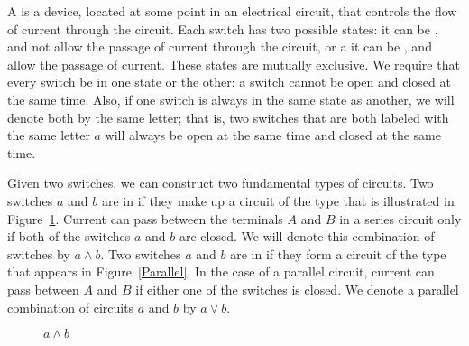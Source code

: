  
A  is a device, located at
some point in an electrical circuit, that controls the flow of current
through the circuit. Each switch has two possible states: it can
be , and not allow the passage of current
through the circuit,  or a it can be , and allow the passage of current. These
states are mutually exclusive. We require that every switch be in one 
state or the other: a switch cannot be open and closed at the same
time.  Also, if one switch is always in the same state as another, we
will denote both by the same letter; that is, two switches that are
both labeled with the same letter $a$ will always be open at the same
time and closed at the same time.  
 
 
Given two switches, we can construct two fundamental types of
circuits. Two switches $a$ and $b$ are in  if they make up a circuit of the type
that is illustrated in Figure~\ref{Series}. Current can pass between
the terminals $A$ and $B$ in a series circuit only if both of the
switches $a$ and $b$ are closed. We will denote this combination of
switches by $a \wedge b$. Two switches $a$ and $b$ are in  if they form a circuit
of the type that appears in Figure~\ref{Parallel}.  In the case of a
parallel circuit, current can pass between $A$ and $B$ if
either one of the switches is closed.  We denote a parallel
combination of circuits $a$ and $b$ by $a \vee b$.   



\begin{figure}[htb]
\begin{center}

\end{center}
\caption{$a \wedge b$}
\label{Series}
\end{figure}



